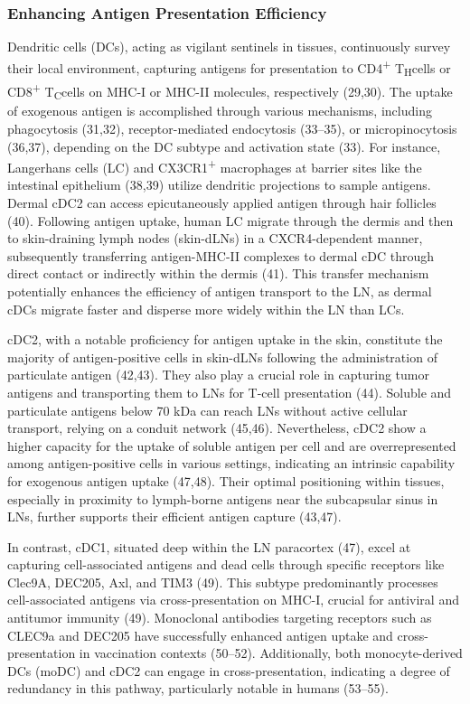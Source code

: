 \documentclass[
]{article}
\begin{document}
\subsubsection{Enhancing Antigen Presentation
Efficiency}\label{enhancing-antigen-presentation-efficiency}

Dendritic cells (DCs), acting as vigilant sentinels in tissues,
continuously survey their local environment, capturing antigens for
presentation to CD4\textsuperscript{+} T\textsubscript{H}cells or
CD8\textsuperscript{+} T\textsubscript{C}cells on MHC-I or MHC-II
molecules, respectively (29,30). The uptake of exogenous antigen is
accomplished through various mechanisms, including phagocytosis (31,32),
receptor-mediated endocytosis (33--35), or micropinocytosis (36,37),
depending on the DC subtype and activation state (33). For instance,
Langerhans cells (LC) and CX3CR1\textsuperscript{+} macrophages at
barrier sites like the intestinal epithelium (38,39) utilize dendritic
projections to sample antigens. Dermal cDC2 can access epicutaneously
applied antigen through hair follicles (40). Following antigen uptake,
human LC migrate through the dermis and then to skin-draining lymph
nodes (skin-dLNs) in a CXCR4-dependent manner, subsequently transferring
antigen-MHC-II complexes to dermal cDC through direct contact or
indirectly within the dermis (41). This transfer mechanism potentially
enhances the efficiency of antigen transport to the LN, as dermal cDCs
migrate faster and disperse more widely within the LN than LCs.

cDC2, with a notable proficiency for antigen uptake in the skin,
constitute the majority of antigen-positive cells in skin-dLNs following
the administration of particulate antigen (42,43). They also play a
crucial role in capturing tumor antigens and transporting them to LNs
for T-cell presentation (44). Soluble and particulate antigens below 70
kDa can reach LNs without active cellular transport, relying on a
conduit network (45,46). Nevertheless, cDC2 show a higher capacity for
the uptake of soluble antigen per cell and are overrepresented among
antigen-positive cells in various settings, indicating an intrinsic
capability for exogenous antigen uptake (47,48). Their optimal
positioning within tissues, especially in proximity to lymph-borne
antigens near the subcapsular sinus in LNs, further supports their
efficient antigen capture (43,47).

In contrast, cDC1, situated deep within the LN paracortex (47), excel at
capturing cell-associated antigens and dead cells through specific
receptors like Clec9A, DEC205, Axl, and TIM3 (49). This subtype
predominantly processes cell-associated antigens via cross-presentation
on MHC-I, crucial for antiviral and antitumor immunity (49). Monoclonal
antibodies targeting receptors such as CLEC9a and DEC205 have
successfully enhanced antigen uptake and cross-presentation in
vaccination contexts (50--52). Additionally, both monocyte-derived DCs
(moDC) and cDC2 can engage in cross-presentation, indicating a degree of
redundancy in this pathway, particularly notable in humans (53--55).
\end{document}
